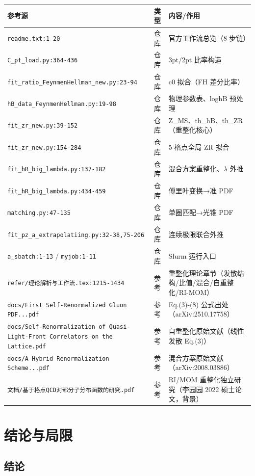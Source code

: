 \documentclass[UTF8]{ctexart}
\begin{document}
\begin{longtable}{@{}l l p{7cm}@{}}
\toprule
\textbf{参考源} & \textbf{类型} & \textbf{内容/作用} \\
\midrule
\endhead
\texttt{readme.txt:1-20} & 仓库 & 官方工作流总览（8 步链） \\
\texttt{C\_pt\_load.py:364-436} & 仓库 & 3pt/2pt 比率构造 \\
\texttt{fit\_ratio\_FeynmenHellman\_new.py:23-94} & 仓库 & c0 拟合（FH 差分比率） \\
\texttt{hB\_data\_FeynmenHellman.py:19-98} & 仓库 & 物理参数表、loghB 预处理 \\
\texttt{fit\_zr\_new.py:39-152} & 仓库 & Z\_MS、th\_hB、th\_ZR（重整化核心） \\
\texttt{fit\_zr\_new.py:154-284} & 仓库 & 5 格点全局 ZR 拟合 \\
\texttt{fit\_hR\_big\_lambda.py:137-182} & 仓库 & 混合方案重整化、$\lambda$ 外推 \\
\texttt{fit\_hR\_big\_lambda.py:434-459} & 仓库 & 傅里叶变换→准 PDF \\
\texttt{matching.py:47-135} & 仓库 & 单圈匹配→光锥 PDF \\
\texttt{fit\_pz\_a\_extrapolatiing.py:32-38,75-206} & 仓库 & 连续极限联合外推 \\
\texttt{a\_sbatch:1-13} / \texttt{myjob:1-11} & 仓库 & Slurm 运行入口 \\
\texttt{refer/理论解析与工作流.tex:1215-1434} & 参考 & 重整化理论章节（发散结构/比值/混合/自重整化/RI-MOM） \\
\texttt{docs/First Self-Renormalized Gluon PDF...pdf} & 参考 & Eq.(3)-(8) 公式出处（arXiv:2510.17758） \\
\texttt{docs/Self-Renormalization of Quasi-Light-Front Correlators on the Lattice.pdf} & 参考 & 自重整化原始文献（线性发散 Eq.(3)） \\
\texttt{docs/A Hybrid Renormalization Scheme...pdf} & 参考 & 混合方案原始文献（arXiv:2008.03886） \\
\texttt{文档/基于格点QCD对部分子分布函数的研究.pdf} & 参考 & RI/MOM 重整化独立研究（李园园 2022 硕士论文，背景） \\
\bottomrule
\end{longtable}

\section{结论与局限}

\subsection{结论}
\end{document}
